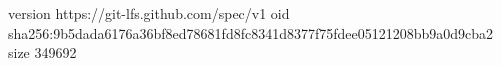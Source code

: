 version https://git-lfs.github.com/spec/v1
oid sha256:9b5dada6176a36bf8ed78681fd8fc8341d8377f75fdee05121208bb9a0d9cba2
size 349692
